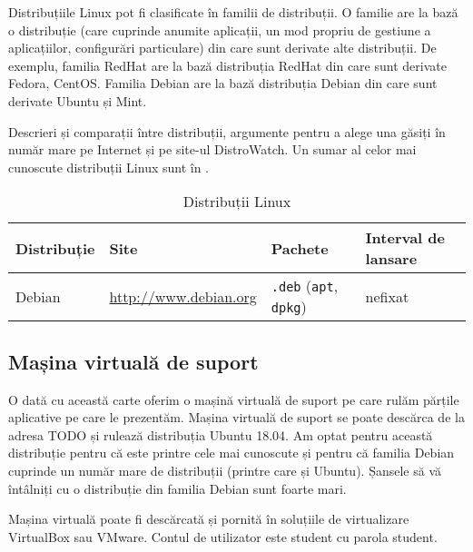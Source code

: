 Distribuțiile Linux pot fi clasificate în familii de distribuții. O familie are la bază o distribuție (care cuprinde anumite aplicații, un mod propriu de gestiune a aplicațiilor, configurări particulare) din care sunt derivate alte distribuții. De exemplu, familia RedHat are la bază distribuția RedHat din care sunt derivate Fedora, CentOS. Familia Debian are la bază distribuția Debian din care sunt derivate Ubuntu și Mint.

Descrieri și comparații între distribuții, argumente pentru a alege una găsiți în număr mare pe Internet și pe site-ul DistroWatch. Un sumar al celor mai cunoscute distribuții Linux sunt în .

\begin{table}[!htb]
  \caption{Distribuții Linux}
  \begin{center}
    \begin{tabular}{ p{} p{} p{} p{} }
      \toprule
        \textbf{Distribuție} &
        \textbf{Site} &
        \textbf{Pachete} &
        \textbf{Interval de lansare} \\
      \midrule
        Debian &
        \url{http://www.debian.org} &
        \texttt{.deb} (\texttt{apt}, \texttt{dpkg}) &
        nefixat \\
      \bottomrule
    \end{tabular}
    \label{tab:intro:distro}
  \end{center}
\end{table}

\subsection{Mașina virtuală de suport}
\label{sec:intro:vm}

O dată cu această carte oferim o mașină virtuală de suport pe care rulăm părțile aplicative pe care le prezentăm. Mașina virtuală de suport se poate descărca de la adresa TODO și rulează distribuția Ubuntu 18.04. Am optat pentru această distribuție pentru că este printre cele mai cunoscute și pentru că familia Debian cuprinde un număr mare de distribuții (printre care și Ubuntu). Șansele să vă întâlniți cu o distribuție din familia Debian sunt foarte mari.

Mașina virtuală poate fi descărcată și pornită în soluțiile de virtualizare VirtualBox sau VMware. Contul de utilizator este student cu parola student.

